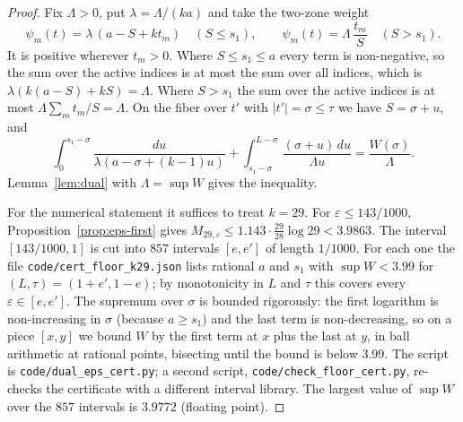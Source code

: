 \documentclass[11pt]{amsart}
\theoremstyle{definition}
\theoremstyle{remark}
\begin{document}
\begin{proof}
Fix $\Lambda>0$, put $\lambda=\Lambda/(ka)$ and take the two-zone weight
\[
\psi_m(t)=\lambda\,(a-S+kt_m)\quad(S\le s_1),\qquad
\psi_m(t)=\Lambda\,\frac{t_m}{S}\quad(S>s_1).
\]
It is positive wherever $t_m>0$. Where $S\le s_1\le a$ every term is
non-negative, so the sum over the active indices is at most the sum over all
indices, which is $\lambda(k(a-S)+kS)=\Lambda$. Where $S>s_1$ the sum over the
active indices is at most $\Lambda\sum_mt_m/S=\Lambda$. On the fiber over $t'$
with $|t'|=\sigma\le\tau$ we have $S=\sigma+u$, and
\[
\int_0^{s_1-\sigma}\frac{du}{\lambda(a-\sigma+(k-1)u)}+\int_{s_1-\sigma}^{L-\sigma}\frac{(\sigma+u)\,du}{\Lambda u}=\frac{W(\sigma)}{\Lambda}.
\]
Lemma~\ref{lem:dual} with $\Lambda=\sup W$ gives the inequality.

For the numerical statement it suffices to treat $k=29$. For
$\varepsilon\le143/1000$, Proposition~\ref{prop:eps-first} gives
$M_{29,\varepsilon}\le1.143\cdot\frac{29}{28}\log29<3.9863$. The interval
$[143/1000,1]$ is cut into $857$ intervals $[e,e']$ of length $1/1000$. For
each one the file \texttt{code/cert\_floor\_k29.json} lists rational $a$ and
$s_1$ with $\sup W<3.99$ for $(L,\tau)=(1+e',1-e)$; by monotonicity in $L$ and
$\tau$ this covers every $\varepsilon\in[e,e']$. The supremum over $\sigma$ is
bounded rigorously: the first logarithm is non-increasing in $\sigma$ (because
$a\ge s_1$) and the last term is non-decreasing, so on a piece $[x,y]$ we bound
$W$ by the first term at $x$ plus the last at $y$, in ball arithmetic at
rational points, bisecting until the bound is below $3.99$. The script is
\texttt{code/dual\_eps\_cert.py}; a second script,
\texttt{code/check\_floor\_cert.py}, re-checks the certificate with a
different interval library. The largest value of $\sup W$ over the $857$
intervals is $3.9772$ (floating point).
\end{proof}
\end{document}
